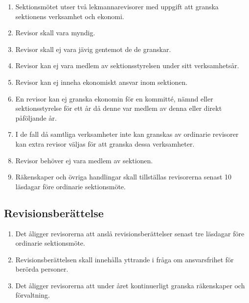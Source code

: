 \documentclass[11pt,a4paper]{article}
\begin{document}
\begin{enumerate}[\thesubsection .1]

  \item Sektionsmötet utser två lekmannarevisorer med uppgift att granska sektionens verksamhet och ekonomi.

\item Revisor skall vara myndig.

\item Revisor skall ej vara jävig gentemot de de granskar.

  
  \item Revisor kan ej vara medlem av sektionsstyrelsen under sitt verksamhetsår.
  
  \item Revisor kan ej inneha ekonomiskt ansvar inom sektionen.

  \item En revisor kan ej granska ekonomin för en kommitté, nämnd eller sektionsstyrelse för ett år då denne var medlem av denna eller direkt påföljande år.
  
  \item I de fall då samtliga verksamheter inte kan granskas av ordinarie revisorer kan extra revisor väljas för att granska dessa verksamheter.
  
  \item Revisor behöver ej vara medlem av sektionen.
  
  \item Räkenskaper och övriga handlingar skall tillställas revisorerna senast 10 läsdagar före ordinarie sektionsmöte.

\end{enumerate}

\subsection{Revisionsberättelse}

\begin{enumerate}[\thesubsection .1]

  \item Det åligger revisorerna att anslå revisionsberättelser senast tre läsdagar före
  ordinarie sektionsmöte.

  \item Revisionsberättelsen skall innehålla yttrande i fråga om
  ansvarsfrihet för berörda personer.

  \item Det åligger revisorerna att under året kontinuerligt granska
  rä\-ken\-skaper och förvaltning.

\end{enumerate}
\end{document}
